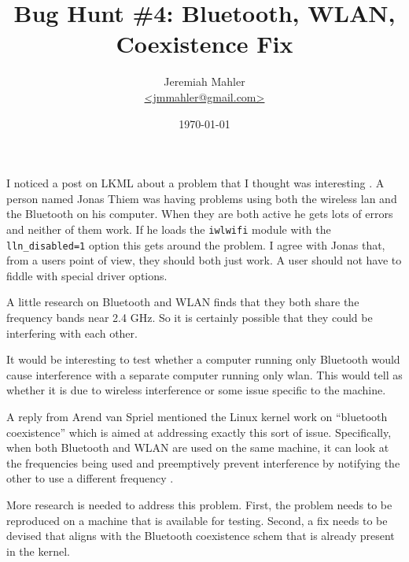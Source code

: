 \documentclass{article}
\begin{document}
\title{Bug Hunt \#4: Bluetooth, WLAN, Coexistence Fix}
\author{
	\Large{Jeremiah Mahler}\\
	\small{\href{mailto:jmmahler@gmail.com}{\textless jmmahler@gmail.com\textgreater}}
}
\date{\today}
\maketitle


I noticed a post on LKML about a problem that I thought was interesting
\autocite{lkml201564703}.
A person named Jonas Thiem was having problems using both the wireless lan
and the Bluetooth on his computer.
When they are both active he gets lots of errors and neither of them
work.
If he loads the \verb+iwlwifi+ module with the \verb+lln_disabled=1+
option this gets around the problem.
I agree with Jonas that, from a users point of view, they should both
just work.
A user should not have to fiddle with special driver options.

A little research on Bluetooth and WLAN finds that they both share
the frequency bands near 2.4 GHz\autocite{wiki:bt, wiki:802.11n}.
So it is certainly possible that they could be interfering with each
other.

It would be interesting to test whether a computer running only
Bluetooth would cause interference with a separate computer running
only wlan.
This would tell as whether it is due to wireless interference or some
issue specific to the machine.

A reply from Arend van Spriel\autocite{lkml201565137} mentioned the
Linux kernel work on ``bluetooth coexistence'' which is aimed at
addressing exactly this sort of issue.
Specifically, when both Bluetooth and WLAN are used on the same machine,
it can look at the frequencies being used and preemptively prevent
interference by notifying the other to use a different frequency
\autocite{bluetooth-coexistence}.

More research is needed to address this problem.
First, the problem needs to be reproduced on a machine that is available
for testing.
Second, a fix needs to be devised that aligns with the Bluetooth
coexistence schem that is already present in the kernel.

\end{document}
